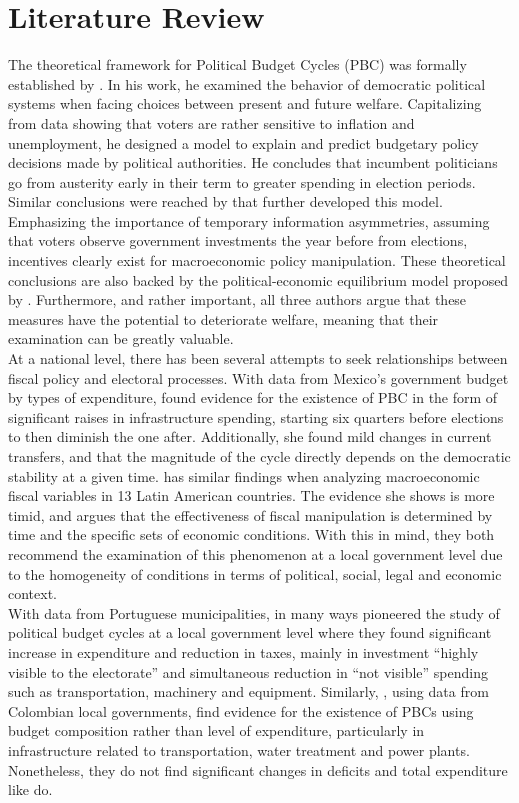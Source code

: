 \section{Literature Review}
The theoretical framework for Political Budget Cycles (PBC) was formally established by \textcite{nordhaus1975}. In his work, he examined the behavior of democratic political systems when facing choices between present and future welfare. Capitalizing from data showing that voters are rather sensitive to inflation and unemployment, he designed a model to explain and predict budgetary policy decisions made by political authorities. He concludes that incumbent politicians go from austerity early in their term to greater spending in election periods. Similar conclusions were reached by \textcite{rogoff1988} that further developed this model. Emphasizing the importance of temporary information asymmetries, assuming that voters observe government investments the year before from elections, incentives clearly exist for macroeconomic policy manipulation. These theoretical conclusions are also backed by the political-economic equilibrium model proposed by \textcite{drazen2010}. Furthermore, and rather important, all three authors argue that these measures have the potential to deteriorate welfare, meaning that their examination can be greatly valuable.
\\
At a national level, there has been several attempts to seek relationships between fiscal policy and electoral processes. With data from Mexico's government budget by types of expenditure, \textcite{gonzalez2002} found evidence for the existence of PBC in the form of significant raises in infrastructure spending, starting six quarters before elections to then diminish the one after. Additionally, she found mild changes in current transfers, and that the magnitude of the cycle directly depends on the democratic stability at a given time. \textcite{lankaster2017} has similar findings when analyzing macroeconomic fiscal variables in 13 Latin American countries. The evidence she shows is more timid, and argues that the effectiveness of fiscal manipulation is determined by time and the specific sets of economic conditions. With this in mind, they both recommend the examination of this phenomenon at a local government level due to the homogeneity of conditions in terms of political, social, legal and economic context.
\\
With data from Portuguese municipalities, \textcite{veiga2007} in many ways pioneered the study of political budget cycles at a local government level where they found significant increase in expenditure and reduction in taxes, mainly in investment “highly visible to the electorate” and simultaneous reduction in “not visible” spending such as transportation, machinery and equipment. Similarly, \textcite{drazen2010}, using data from Colombian local governments, find evidence for the existence of PBCs using budget composition rather than level of expenditure, particularly in infrastructure related to transportation, water treatment and power plants. Nonetheless, they do not find significant changes in deficits and total expenditure like \textcite{veiga2007} do.
